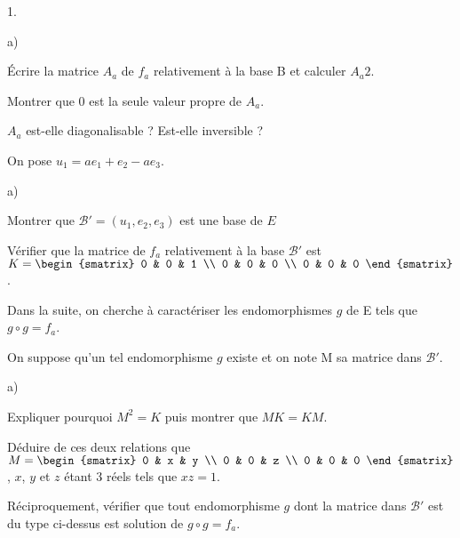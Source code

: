 \documentclass[11pt]{article}%
\begin{document}
\begin{noliste}{1.}
 \setlength{\itemsep}{4mm}
\item 

\begin{noliste}{a)}
 \setlength{\itemsep}{2mm}
\item Écrire la matrice $A_{a}$ de $f_{a}$ relativement à la base B et
calculer $A_{a}{2}$.

\item Montrer que $0$ est la seule valeur propre de $A_{a}$.

\item $A_{a}$ est-elle diagonalisable ? Est-elle inversible ?
\end{noliste}

\item On pose $u_{1} = ae_{1} + e_{2}-ae_{3}$.

\begin{noliste}{a)}
 \setlength{\itemsep}{2mm}
\item Montrer que $\mathcal{B}{\prime } = (u_{1},e_{2},e_{3})$ est une
base
de $E$\\

\item Vérifier que la matrice de $f_{a}$ relativement à la base
$\mathcal{B}{\prime }$ est $K = 
\begin{smatrix}
0 & 0 & 1 \\
0 & 0 & 0 \\
0 & 0 & 0
\end{smatrix}
$.
\end{noliste}

Dans la suite, on cherche à caractériser les endomorphismes $g$ de E
tels
que $g\circ g = f_{a}$.

\item On suppose qu'un tel endomorphisme $g$ existe et on note M sa
matrice
dans $\mathcal{B}{\prime }$.

\begin{noliste}{a)}
 \setlength{\itemsep}{2mm}
\item Expliquer pourquoi $M^{2} = K$ puis montrer que $MK = KM$.

\item Déduire de ces deux relations que $M = 
\begin{smatrix}
0 & x & y \\
0 & 0 & z \\
0 & 0 & 0
\end{smatrix}
$, $x$, $y$ et $z$ étant 3 réels tels que $xz = 1$.
\end{noliste}

\item Réciproquement, vérifier que tout endomorphisme $g$ dont la
matrice
dans $\mathcal{B}{\prime }$ est du type ci-dessus est solution de
$g\circ
g = f_{a}$.
\end{noliste}
\end{document}
